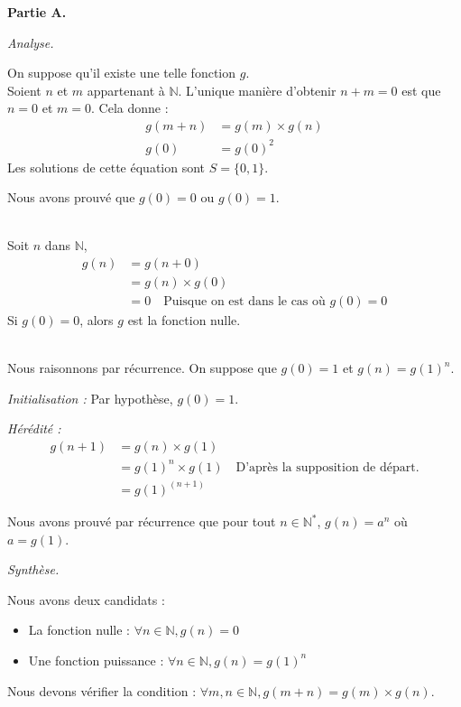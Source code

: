 \documentclass[]{../templates/homework}
\begin{document}
\textbf{Partie A.}

\subproblem
\textit{Analyse.}

On suppose qu'il existe une telle fonction $g$.
\question \\
Soient $n$ et $m$ appartenant à $\mathbb{N}$. L'unique manière d'obtenir $n + m = 0$ est que $n = 0$ et $m = 0$.
Cela donne :
\begin{align*}
	g(m + n) & = g(m) \times g(n) \\
	g(0)     & = g(0)^2
\end{align*}
Les solutions de cette équation sont $S = \{0, 1\}$.

Nous avons prouvé que $g(0) = 0$ ou $g(0) = 1$.

\question \\
Soit $n$ dans $\mathbb{N}$,
\begin{align*}
	g(n) & = g(n + 0) \\
	& = g(n) \times g(0) \\
	& = 0 \quad \text{Puisque on est dans le cas où $g(0) = 0$}
\end{align*}
Si $g(0) = 0$, alors $g$ est la fonction nulle.

\question \\
Nous raisonnons par récurrence. On suppose que $g(0) = 1$ et $g(n) = g(1)^n$.

\textit{Initialisation :}
Par hypothèse, $g(0) = 1$.

\textit{Hérédité :}
\begin{align*}
	g(n + 1) &= g(n) \times g(1) \\
	&= g(1)^n \times g(1) \quad \text{D'après la supposition de départ.} \\
	&= g(1)^{(n + 1)}
\end{align*}

Nous avons prouvé par récurrence que pour tout $n \in \mathbb{N^*}$, $g(n) = a^n$ où $a=g(1)$.

\subproblem
\textit{Synthèse.}

Nous avons deux candidats :
\begin{itemize}
	\item La fonction nulle : $\forall n \in \mathbb{N}, g(n) = 0$
	\item Une fonction puissance : $\forall n \in \mathbb{N}, g(n) = g(1)^n$
\end{itemize}
Nous devons vérifier la condition : $\forall m, n \in \mathbb{N}, g(m + n) = g(m) \times g(n)$.
\end{document}
